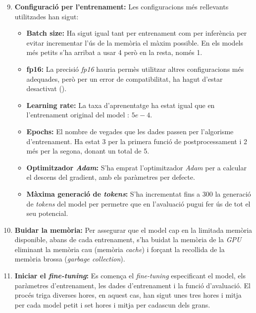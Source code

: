 \begin{enumerate}
    \setcounter{enumi}{8}
    \item \textbf{Configuració per l'entrenament:} Les configuracions més rellevants utilitzades han sigut:
        \begin{itemize}
            \item \textbf{Batch size:} Ha sigut igual tant per entrenament com per inferència per evitar incrementar l'ús de la memòria el màxim possible. En els models més petits s'ha arribat a usar 4 però en la resta, només 1.
            \item \textbf{fp16:} La precisió \textit{fp16} hauria permès utilitzar altres configuracions més adequades, però per un error de compatibilitat, ha hagut d'estar desactivat ().
            \item \textbf{Learning rate:} La taxa d'aprenentatge ha estat igual que en l'entrenament original del model \cite{flan-t5}: $5e-4$.
            \item \textbf{Epochs:} El nombre de vegades que les dades passen per l'algorisme d'entrenament. Ha estat 3 per la primera funció de postprocessament i 2 més per la segona, donant un total de 5.
            \item \textbf{Optimitzador \textit{Adam}:} S'ha emprat l'optimitzador \textit{Adam} per a calcular el descens del gradient, amb els paràmetres per defecte.
            \item \textbf{Màxima generació de \textit{tokens}:} S'ha incrementat fins a 300 la generació de \textit{tokens} del model per permetre que en l'avaluació pugui fer ús de tot el seu potencial.
        \end{itemize}
    \item \textbf{Buidar la memòria:} Per assegurar que el model cap en la limitada memòria disponible, abans de cada entrenament, s'ha buidat la memòria de la \textit{GPU} eliminant la memòria cau (memòria \textit{cache}) i forçant la recollida de la memòria brossa (\textit{garbage collection}).
    \item \textbf{Iniciar el \textit{fine-tuning}:} Es comença el \textit{fine-tuning} especificant el model, els paràmetres d'entrenament, les dades d'entrenament i la funció d'avaluació. El procés triga diverses hores, en aquest cas, han sigut unes tres hores i mitja per cada model petit i set hores i mitja per cadascun dels grans.
\end{enumerate}
